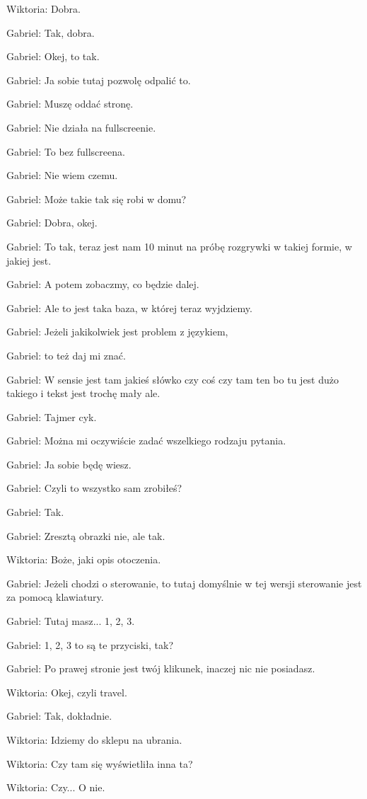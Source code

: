 Wiktoria: Dobra.

Gabriel: Tak, dobra.

Gabriel: Okej, to tak.

Gabriel: Ja sobie tutaj pozwolę odpalić to.

Gabriel: Muszę oddać stronę.

Gabriel: Nie działa na fullscreenie.

Gabriel: To bez fullscreena.

Gabriel: Nie wiem czemu.

Gabriel: Może takie tak się robi w domu?

Gabriel: Dobra, okej.

Gabriel: To tak, teraz jest nam 10 minut na próbę rozgrywki w takiej formie, w jakiej jest.

Gabriel: A potem zobaczmy, co będzie dalej.

Gabriel: Ale to jest taka baza, w której teraz wyjdziemy.

Gabriel: Jeżeli jakikolwiek jest problem z językiem,

Gabriel: to też daj mi znać.

Gabriel: W sensie jest tam jakieś słówko czy coś czy tam ten bo tu jest dużo takiego i tekst jest trochę mały ale.

Gabriel: Tajmer cyk.

Gabriel: Można mi oczywiście zadać wszelkiego rodzaju pytania.

Gabriel: Ja sobie będę wiesz.

Gabriel: Czyli to wszystko sam zrobiłeś?

Gabriel: Tak.

Gabriel: Zresztą obrazki nie, ale tak.

Wiktoria: Boże, jaki opis otoczenia.

Gabriel: Jeżeli chodzi o sterowanie, to tutaj domyślnie w tej wersji sterowanie jest za pomocą klawiatury.

Gabriel: Tutaj masz... 1, 2, 3.

Gabriel: 1, 2, 3 to są te przyciski, tak?

Gabriel: Po prawej stronie jest twój klikunek, inaczej nic nie posiadasz.

Wiktoria: Okej, czyli travel.

Gabriel: Tak, dokładnie.

Wiktoria: Idziemy do sklepu na ubrania.

Wiktoria: Czy tam się wyświetliła inna ta?

Wiktoria: Czy... O nie.

